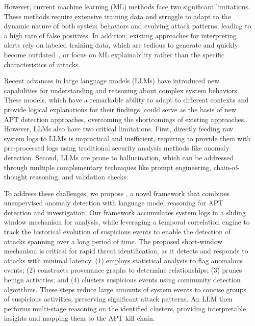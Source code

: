 However, current machine learning (ML) methods face two significant limitations. 
These methods require extensive training data and struggle to adapt to the dynamic nature of both system behaviors and evolving attack patterns, leading to a high rate of false positives. 
In addition, existing approaches for interpreting alerts rely on labeled training data, which are tedious to generate and quickly become outdated~\cite{alsaheel2021atlas,milajerdi2019holmes,hossain2017sleuth,hassan2020tactical}, or focus on ML explainability rather than the specific characteristics of attacks.

Recent advances in large language models (LLMs) have introduced new capabilities for understanding and reasoning about complex system behaviors. 
These models, which have a remarkable ability to adapt to different contexts and provide logical explanations for their findings, could serve as the basis of new APT detection approaches, overcoming the shortcomings of existing approaches. 
However, LLMs also have two critical limitations. 
First, directly feeding raw system logs to LLMs is impractical and inefficient, requiring to provide them with pre-processed logs using traditional security analysis methods like anomaly detection. 
Second, LLMs are prone to hallucination, which can be addressed through multiple complementary techniques like prompt engineering, chain-of-thought reasoning, and validation checks.

To address these challenges, we propose \method, a novel framework that combines unsupervised anomaly detection with language model reasoning for APT detection and investigation. 
Our framework accumulates system logs in a sliding window mechanism for analysis, while leveraging a temporal correlation engine to track the historical evolution of suspicious events to enable the detection of attacks spanning over a long period of time. 
The proposed short-window mechanism is critical for rapid threat identification, as it detects and responds to attacks with minimal latency. 
\method (1) employs statistical analysis to flag anomalous events; (2) constructs provenance graphs to determine relationships; (3) prunes benign activities; and (4) clusters suspicious events using community detection algorithms. 
These steps reduce large amounts of system events to concise groups of suspicious activities, preserving significant attack patterns. 
An LLM then performs multi-stage reasoning on the identified clusters, providing interpretable insights and mapping them to the APT kill chain. 

